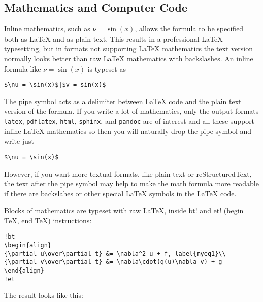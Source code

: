\documentclass[%
oneside,                 %
final,                   %
10pt]{article}
\begin{document}
\noindent
\subsection{Mathematics and Computer Code}

Inline mathematics, such as $\nu = \sin(x)$,
allows the formula to be specified both as {\LaTeX} and as plain text.
This results in a professional {\LaTeX} typesetting, but in formats
not supporting {\LaTeX} mathematics
the text version normally looks better than raw {\LaTeX} mathematics with
backslashes. An inline formula like $\nu = \sin(x)$ is
typeset as

\begin{Verbatim}[fontsize=\fontsize{9pt}{9pt},tabsize=8,baselinestretch=0.85,
fontfamily=tt,xleftmargin=7mm]
$\nu = \sin(x)$|$v = sin(x)$
\end{Verbatim}
\noindent
The pipe symbol acts as a delimiter between {\LaTeX} code and the plain text
version of the formula. If you write a lot of mathematics, only the
output formats {\fontsize{10pt}{10pt}\Verb!latex!}, {\fontsize{10pt}{10pt}\Verb!pdflatex!}, {\fontsize{10pt}{10pt}\Verb!html!}, {\fontsize{10pt}{10pt}\Verb!sphinx!}, and {\fontsize{10pt}{10pt}\Verb!pandoc!}
are of interest
and all these support inline {\LaTeX} mathematics so then you will naturally
drop the pipe symbol and write just

\begin{Verbatim}[fontsize=\fontsize{9pt}{9pt},tabsize=8,baselinestretch=0.85,
fontfamily=tt,xleftmargin=7mm]
$\nu = \sin(x)$
\end{Verbatim}
\noindent
However, if you want more textual formats, like plain text or reStructuredText,
the text after the pipe symbol may help to make the math formula more readable
if there are backslahes or other special {\LaTeX} symbols in the {\LaTeX} code.

Blocks of mathematics are typeset with raw {\LaTeX}, inside
{\fontsize{10pt}{10pt}\Verb!!bt!} and {\fontsize{10pt}{10pt}\Verb!!et!} (begin TeX, end TeX) instructions:

\begin{Verbatim}[fontsize=\fontsize{9pt}{9pt},tabsize=8,baselinestretch=0.85,
fontfamily=tt,xleftmargin=7mm]
!bt
\begin{align}
{\partial u\over\partial t} &= \nabla^2 u + f, label{myeq1}\\ 
{\partial v\over\partial t} &= \nabla\cdot(q(u)\nabla v) + g
\end{align}
!et
\end{Verbatim}
\noindent
The result looks like this:
\end{document}
